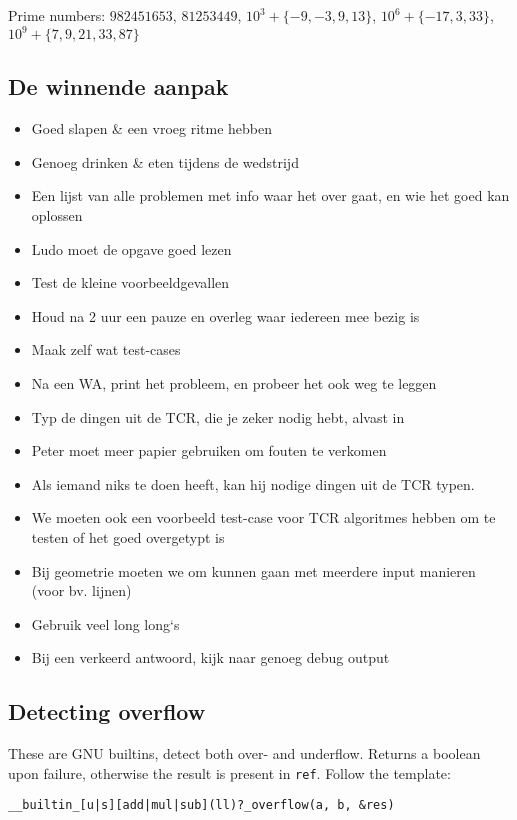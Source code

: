 \documentclass{article}
\begin{document}
Prime numbers: $\mathit{982451653}$, $\mathit{81253449}$, $10^3 + \{-9,-3,9,13\}$, $10^6 + \{-17, 3, 33\}$, $10^9 + \{7,9,21,33,87\}$

\subsection{De winnende aanpak}

\begin{itemize}
	\setlength\itemsep{-.25em}
	\item Goed slapen \& een vroeg ritme hebben
	\item Genoeg drinken \& eten tijdens de wedstrijd
	\item Een lijst van alle problemen met info waar het over gaat, en wie het goed kan oplossen
	\item Ludo moet de opgave goed lezen
	\item Test de kleine voorbeeldgevallen
	\item Houd na 2 uur een pauze en overleg waar iedereen mee bezig is
	\item Maak zelf wat test-cases
	\item Na een WA, print het probleem, en probeer het ook weg te leggen
	\item Typ de dingen uit de TCR, die je zeker nodig hebt, alvast in
	\item Peter moet meer papier gebruiken om fouten te verkomen
	\item Als iemand niks te doen heeft, kan hij nodige dingen uit de TCR typen.
	\item We moeten ook een voorbeeld test-case voor TCR algoritmes hebben om te testen of het goed overgetypt is
	\item Bij geometrie moeten we om kunnen gaan met meerdere input manieren (voor bv. lijnen)
	\item Gebruik veel long long`s
	\item Bij een verkeerd antwoord, kijk naar genoeg debug output
\end{itemize}

\subsection{Detecting overflow}
These are GNU builtins, detect both over- and underflow. Returns a boolean upon failure, otherwise the result is present in \texttt{ref}. Follow the template:

\texttt{\_\_builtin\_[u|s][add|mul|sub](ll)?\_overflow(a, b, \&res)}
\end{document}
